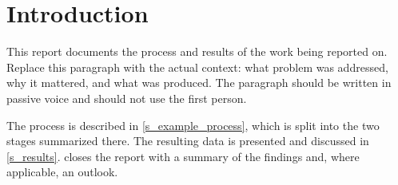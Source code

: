 \chapter{Introduction}%
\label{s_introduction}

This report documents the process and results of the work being reported
on. Replace this paragraph with the actual context: what problem was
addressed, why it mattered, and what was produced. The paragraph should
be written in passive voice and should not use the first person.

The process is described in \cref{s_example_process}, which is split
into the two stages summarized there. The resulting data is presented
and discussed in \cref{s_results}.  closes the report
with a summary of the findings and, where applicable, an outlook.
